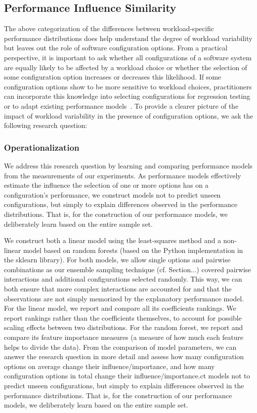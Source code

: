 \subsection{Performance Influence Similarity}
The above categorization of the differences between workload-specific performance distributions does help understand the degree of workload variability but leaves out the role of software configuration options. From a practical perspective, it is important to ask whether all configurations of a software system are equally likely to be affected by a workload choice or whether the selection of some configuration option increases or decreases this likelihood. If some configuration options show to be more sensitive to workload choices, practitioners can incorporate this knowledge into selecting configurations for regression testing or to adapt existing performance models~\cite{jamshidi_learning_2018}. To provide a clearer picture of the impact of workload variability in the presence of configuration options, we ask the following research question:


\subsubsection{Operationalization}
We address this research question by learning and comparing performance models from the measurements of our experiments. As performance models effectively estimate the influence the selection of one or more options has on a configuration’s performance, we construct models not to predict unseen configurations, but simply to explain differences observed in the performance distributions. That is, for the construction of our performance models, we deliberately learn based on the entire sample set.

We construct both a linear model using the least-squares method and a non-linear model based on random forests (based on the Python implementation in the sklearn library). For both models, we allow single options and pairwise combinations as our ensemble sampling technique (cf. Section...) covered pairwise interactions and additional configurations selected randomly. This way, we can both ensure that more complex interactions are accounted for and that the observations are not simply memorized by the explanatory performance model. For the linear model, we report and compare all its coefficients rankings. We report rankings rather than the coefficients themselves, to account for possible scaling effects between two distributions. For the random forest, we report and compare its feature importance measures (a measure of how much each feature helps to divide the data). From the comparison of model parameters, we can answer the research question in more detail and assess how many configuration options on average change their influence/importance, and how many configuration options in total change their influence/importance.ct models not to predict unseen configurations, but simply to explain differences observed in the performance distributions. That is, for the construction of our performance models, we deliberately learn based on the entire sample set.

